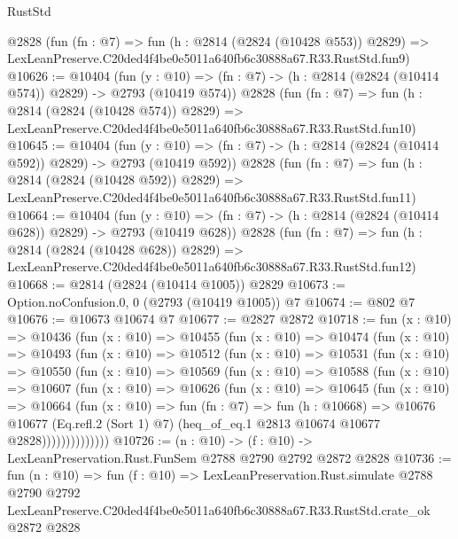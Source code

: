 \begin{lexlean}{RustStd}
\begin{coremodule}
    @2828
    (fun (fn : @7) =>
    fun (h : @2814 (@2824 (@10428 @553)) @2829) =>
    LexLeanPreserve.C20ded4f4be0e5011a640fb6c30888a67.R33.RustStd.fun9)
@10626 := @10404
    (fun (y : @10) => (fn : @7) -> (h : @2814 (@2824 (@10414 @574)) @2829) -> @2793 (@10419 @574))
    @2828
    (fun (fn : @7) =>
    fun (h : @2814 (@2824 (@10428 @574)) @2829) =>
    LexLeanPreserve.C20ded4f4be0e5011a640fb6c30888a67.R33.RustStd.fun10)
@10645 := @10404
    (fun (y : @10) => (fn : @7) -> (h : @2814 (@2824 (@10414 @592)) @2829) -> @2793 (@10419 @592))
    @2828
    (fun (fn : @7) =>
    fun (h : @2814 (@2824 (@10428 @592)) @2829) =>
    LexLeanPreserve.C20ded4f4be0e5011a640fb6c30888a67.R33.RustStd.fun11)
@10664 := @10404
    (fun (y : @10) => (fn : @7) -> (h : @2814 (@2824 (@10414 @628)) @2829) -> @2793 (@10419 @628))
    @2828
    (fun (fn : @7) =>
    fun (h : @2814 (@2824 (@10428 @628)) @2829) =>
    LexLeanPreserve.C20ded4f4be0e5011a640fb6c30888a67.R33.RustStd.fun12)
@10668 := @2814 (@2824 (@10414 @1005)) @2829
@10673 := Option.noConfusion.{0, 0} (@2793 (@10419 @1005)) @7
@10674 := @802 @7
@10676 := @10673 @10674 @7
@10677 := @2827 @2872
@10718 := fun (x : @10) =>
  @10436
    (fun (x : @10) =>
    @10455
      (fun (x : @10) =>
      @10474
        (fun (x : @10) =>
        @10493
          (fun (x : @10) =>
          @10512
            (fun (x : @10) =>
            @10531
              (fun (x : @10) =>
              @10550
                (fun (x : @10) =>
                @10569
                  (fun (x : @10) =>
                  @10588
                    (fun (x : @10) =>
                    @10607
                      (fun (x : @10) =>
                      @10626
                        (fun (x : @10) =>
                        @10645
                          (fun (x : @10) =>
                          @10664
                            (fun (x : @10) =>
                            fun (fn : @7) =>
                            fun (h : @10668) =>
                            @10676
                              @10677
                              (Eq.refl.{2} (Sort 1) @7)
                              (heq_of_eq.{1} @2813 @10674 @10677 @2828))))))))))))))
@10726 := (n : @10) -> (f : @10) -> LexLeanPreservation.Rust.FunSem @2788 @2790 @2792 @2872 @2828
@10736 := fun (n : @10) =>
  fun (f : @10) =>
  LexLeanPreservation.Rust.simulate
    @2788
    @2790
    @2792
    LexLeanPreserve.C20ded4f4be0e5011a640fb6c30888a67.R33.RustStd.crate_ok
    @2872
    @2828
\end{coremodule}
\end{lexlean}
